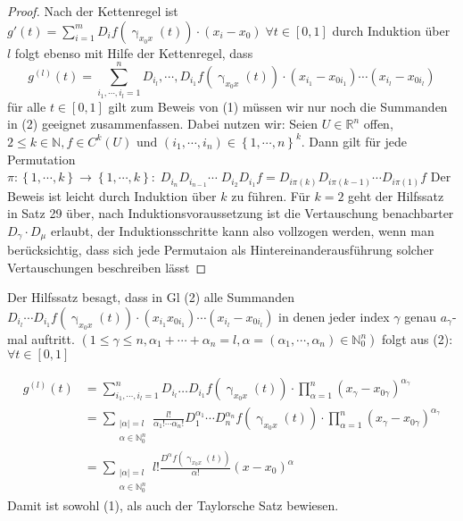 \begin{proof}
	Nach der Kettenregel ist $ g' \left(t\right) = \sum_{i=1}^{m}D_i f \left( \upgamma_{x_0x} \left(t\right)  \right) \cdot 
	\left( x_i-x_0 \right) \; \forall t \in [0,1]$ durch Induktion über $ l $ folgt ebenso mit Hilfe der Kettenregel, dass 
	\begin{equation}
		g^{\left(l\right) } \left(t\right) = \sum_{i_1, \cdots,  i_l = 1}^{n} D_{i_{l}} , \cdots,  D_{i_{1}} f \left( \upgamma_{x_0x}
		\left(t\right) \right) \cdot \left( x_{i_1} - x_{0i_1} \right) \cdots \left( x_{i_{l}} - x_{0i_{l}} \right) 
	\tag{2}
	\end{equation}
	für alle $ t \in [0,1] $ gilt zum Beweis von (1) müssen wir nur noch die Summanden in (2) geeignet zusammenfassen. Dabei nutzen wir:
Seien $ U \in \mathbb{R}^n  $ offen, $ 2 \leq  k \in \mathbb{N}, f \in C^{k} \left(U\right)  \text{ und }  \left( i_1 , \cdots,  i_{n} 
\right) \in \left\{ 1, \cdots,  n \right\} ^{k} $. Dann gilt für jede Permutation $ \pi : \left\{ 1, \cdots,  k \right\} \to 
\left\{ 1, \cdots,  k \right\} : \; D_{i_{n}} D_{i_{n-1}}  \cdots \; D_{i_2} D_{i_1} f = D_{i \pi \left(k\right) } D_{i \pi (k-1)} 
 \cdots D_{i \pi (1)} f  $ 
 \parskip=3pt
 Der Beweis ist leicht durch Induktion über $ k $ zu führen. Für $ k=2 $ geht der Hilfssatz in Satz 29 über, nach Induktionsvoraussetzung
 ist die Vertauschung benachbarter $ D_{\gamma } \cdot D_{\mu}$ erlaubt, der Induktionsschritte kann also vollzogen werden, wenn man 
 berücksichtig, dass sich jede Permutaion als Hintereinanderausführung solcher Vertauschungen beschreiben lässt
\end{proof}

Der Hilfssatz besagt, dass in Gl (2) alle Summanden $ D_{i_{l}} \cdots D_{i_1} f \left( \upgamma_{x_0x} \left(t\right)  \right) 
\cdot \left( x_{i_1} x_{0i_1} \right) \cdots \left( x_{i_{l}} - x_{0i_{l}} \right)   $ in denen jeder index $ \gamma  $ genau 
$ a_{\gamma }$-mal auftritt. $ \left( 1 \leq  \gamma  \leq n , \alpha_1 + \cdots + \alpha_n = l, \alpha = 
\left( \alpha_1 , \cdots,  \alpha_n \right) \in  \mathbb{N} _{0}^{n}\right)  $ folgt aus (2): $ \forall t \in [0,1] $ 

\begin{align*}
	g^{\left(l\right) }\left(t\right)  &= \sum_{i_1 , \cdots,  i_{l} = 1}^{n} D_{i_{l}} \dots D_{i_1} f \left( \upgamma_{x_0x}(t)\right) 
	\cdot \prod_{\alpha  = 1}^{n} \left( x_{\gamma } - x_{0 \gamma } \right) ^{\alpha _{\gamma }} \\
	&= \sum_{ \substack{ |\alpha | = l \\ \alpha \in \mathbb{N}_{0}^{n} }} \frac{l !}{\alpha_1 ! \cdots \alpha_n !} D_{1}^{\alpha_1}
	\cdots D_{n}^{\alpha_n} f \left( \upgamma_{x_0x} \left(t\right)  \right) \cdot \prod_{\alpha = 1}^{n} \left( 
		x_\gamma - x_{0 \gamma }\right)^{\alpha_{\gamma }}  \\
		&= \sum_{ \substack{ |\alpha | = l \\ \alpha \in \mathbb{N}_{0}^{n} }} l ! \frac{D^{\alpha }f \left( \upgamma_{x_0x} 
		\left(t\right) \right) }{\alpha !} \left( x - x_0 \right)^{\alpha }
\end{align*}
Damit ist sowohl (1), als auch der Taylorsche Satz bewiesen.


%

